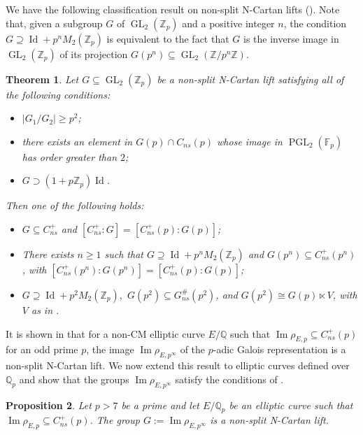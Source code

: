 \documentclass{amsart}
\newcommand{\op}[1]{\operatorname{#1}}
\newtheorem{theorem}{Theorem}
\newtheorem{proposition}[theorem]{Proposition}
\theoremstyle{definition}
\newcommand{\Z}{\mathbb{Z}}
\newcommand{\Q}{\mathbb{Q}}
\newcommand{\F}{\mathbb{F}}
\newcommand{\GL}{\operatorname{GL}}
\newcommand{\NRep}[1]{\operatorname{Im}\rho_{E,#1}}
\newcommand{\pnRep}[2]{\operatorname{Im}\rho_{E,#1^#2}}
\numberwithin{theorem}{section}
\numberwithin{equation}{section}
\begin{document}
We have the following classification result on non-split N-Cartan lifts (\cite[Theorem 3.14]{furio24}). {Note that, given a subgroup $G$ of $\GL_2(\Z_p)$ and a positive integer $n$, the condition $G \supseteq \operatorname{Id} + p^n M_{2}(\Z_p)$ is equivalent to the fact that $G$ is the inverse image in $\GL_2(\Z_p)$ of its projection $G(p^n) \subseteq \GL_2(\Z/p^n\Z)$.}

\begin{theorem}\label{thm:cartantower}
	Let $G \subseteq \GL_2(\Z_p)$ be a non-split N-Cartan lift satisfying all of the following conditions:
    \begin{itemize}
        \item $|G_1/G_2| \ge p^2$;
        \item there exists an element in  $G(p) \cap C_{ns}(p)$ whose image in $\operatorname{PGL}_2(\F_p)$ has order greater than $2$;
        \item $G \supset (1+p\Z_p) \op{Id}$.
    \end{itemize}
    Then one of the following holds:
	\begin{itemize}
        \item $G \subseteq C_{ns}^+$ and $[C_{ns}^+ : G] = [C_{ns}^+(p) : G(p)]$;
		\item There exists $n \ge 1$ such that $G \supseteq \op{Id} + p^n M_{2}(\Z_p)$ and $G(p^n) \subseteq C_{ns}^+(p^n)$, with $[C_{ns}^+(p^n) : G(p^n)] = [C_{ns}^+(p) : G(p)]$;
		\item $G \supseteq \op{Id} + p^2 M_{2}(\Z_p),$ $G(p^2) \subseteq G_{ns}^\#(p^2)$, and $G(p^2) \cong G(p) \ltimes V$, with $V$ as in .
	\end{itemize}
\end{theorem}

It is shown in \cite{furio24} that for a non-CM elliptic curve $E/\Q$ such that $\NRep{p} \subseteq C_{ns}^+(p)$ for an odd prime $p$, the image $\operatorname{Im}\rho_{E,p^\infty}$ of the $p$-adic Galois representation is a non-split N-Cartan lift. We now extend this result to elliptic curves defined over $\Q_p$ and show that the groups $\operatorname{Im}\rho_{E,p^\infty}$ satisfy the conditions of .

\begin{proposition}\label{prop: N-Cartan lift}
    Let $p>7$ be a prime and let $E/\Q_p$ be an elliptic curve such that $\NRep{p} \subseteq C_{ns}^+(p)$. The group $G:=\pnRep{p}{\infty}$ is a non-split N-Cartan lift.
\end{proposition}
\end{document}
